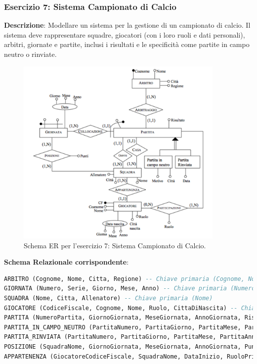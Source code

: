 \subsubsection{Esercizio 7: Sistema Campionato di Calcio}
\textbf{Descrizione}: Modellare un sistema per la gestione di un campionato di calcio. Il sistema deve rappresentare squadre, giocatori (con i loro ruoli e dati personali), arbitri, giornate e partite, inclusi i risultati e le specificità come partite in campo neutro o rinviate.
\begin{figure}[h!]
    \centering
    \includegraphics[width=0.9\textwidth]{immagini/er_esercizio_7_campionato_calcio.png} %
    \caption{Schema ER per l'esercizio 7: Sistema Campionato di Calcio.}
    \label{fig:er_esercizio_7_campionato_calcio}
\end{figure}

\textbf{Schema Relazionale corrispondente}:
\begin{lstlisting}[language=SQL]
ARBITRO (Cognome, Nome, Citta, Regione) -- Chiave primaria (Cognome, Nome) o ID_Arbitro generato
GIORNATA (Numero, Serie, Giorno, Mese, Anno) -- Chiave primaria (Numero, Serie)
SQUADRA (Nome, Citta, Allenatore) -- Chiave primaria (Nome)
GIOCATORE (CodiceFiscale, Cognome, Nome, Ruolo, CittaDiNascita) -- Chiave primaria (CodiceFiscale)
PARTITA (NumeroPartita, GiornoGiornata, MeseGiornata, AnnoGiornata, Risultato, ArbitroCognome, ArbitroNome, CasaSquadra, OspiteSquadra) -- Chiave primaria (NumeroPartita), FK a GIORNATA, FK a ARBITRO, FK a SQUADRA (due volte)
PARTITA_IN_CAMPO_NEUTRO (PartitaNumero, PartitaGiorno, PartitaMese, PartitaAnno, Motivo, CittaCampoNeutro) -- FK a PARTITA
PARTITA_RINVIATA (PartitaNumero, PartitaGiorno, PartitaMese, PartitaAnno, DataRinvio) -- FK a PARTITA
POSIZIONE (SquadraNome, GiornoGiornata, MeseGiornata, AnnoGiornata, Punteggio) -- Chiave primaria (SquadraNome, GiornoGiornata, MeseGiornata, AnnoGiornata), FK a SQUADRA, FK a GIORNATA
APPARTENENZA (GiocatoreCodiceFiscale, SquadraNome, DataInizio, RuoloPrincipale, DataFine) -- Chiave primaria (GiocatoreCodiceFiscale, SquadraNome, DataInizio), FK a GIOCATORE, FK a SQUADRA
\end{lstlisting}

